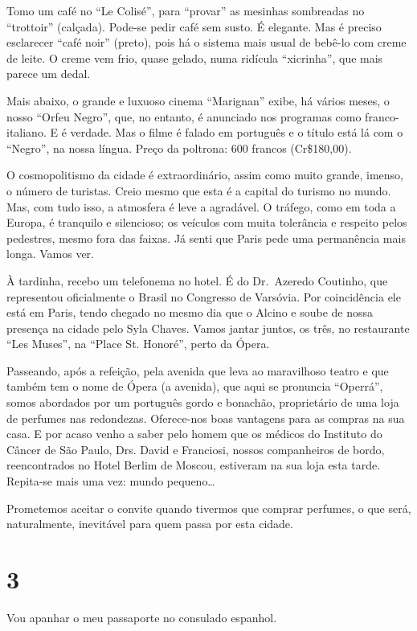 Tomo um café no ``Le Colisé'', para ``provar'' as mesinhas sombreadas no ``trottoir'' (calçada). Pode-se pedir café sem susto. É elegante. Mas é preciso esclarecer ``café noir'' (preto), pois há o sistema mais usual de bebê-lo com creme de leite. O creme vem frio, quase gelado, numa ridícula ``xicrinha'', que mais parece um dedal.

Mais abaixo, o grande e luxuoso cinema ``Marignan'' exibe, há vários meses, o nosso ``Orfeu Negro'', que, no entanto, é anunciado nos programas como franco-italiano. E é verdade. Mas o filme é falado em português e o título está lá com o ``Negro'', na nossa língua. Preço da poltrona: 600 francos (Cr\$180,00).

O cosmopolitismo da cidade é extraordinário, assim como muito grande, imenso, o número de turistas. Creio mesmo que esta é a capital do turismo no mundo. Mas, com tudo isso, a atmosfera é leve a agradável. O tráfego, como em toda a Europa, é tranquilo e silencioso; os veículos com muita tolerância e respeito pelos pedestres, mesmo fora das faixas. Já senti que Paris pede uma permanência mais longa. Vamos ver.

À tardinha, recebo um telefonema no hotel. É do Dr.~Azeredo Coutinho, que representou oficialmente o Brasil no Congresso de Varsóvia. Por coincidência ele está em Paris, tendo chegado no mesmo dia que o Alcino e soube de nossa presença na cidade pelo Syla Chaves. Vamos jantar juntos, os três, no restaurante ``Les Muses'', na ``Place St. Honoré'', perto da Ópera.

Passeando, após a refeição, pela avenida que leva ao maravilhoso teatro e que também tem o nome de Ópera (a avenida), que aqui se pronuncia ``Operrá'', somos abordados por um português gordo e bonachão, proprietário de uma loja de perfumes nas redondezas. Oferece-nos boas vantagens para as compras na sua casa. E por acaso venho a saber pelo homem que os médicos do Instituto do Câncer de São Paulo, Drs. David e Franciosi, nossos companheiros de bordo, reencontrados no Hotel Berlim de Moscou, estiveram na sua loja esta tarde. Repita-se mais uma vez: mundo pequeno\ldots

Prometemos aceitar o convite quando tivermos que comprar perfumes, o que será, naturalmente, inevitável para quem passa por esta cidade.

\section*{3 \adfflatleafright {}}
Vou apanhar o meu passaporte no consulado espanhol.

